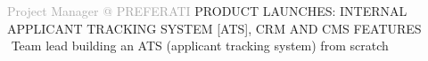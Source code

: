 \begin{cvtable}
%
% 
{\textcolor{darkgray}{%
Project Manager
\newline
@
{P\scriptsize REFERATI}
}}%
{
}%
{%
    {\scriptsize PRODUCT LAUNCHES:
    INTERNAL APPLICANT TRACKING SYSTEM [ATS], %
    CRM AND CMS FEATURES
    } \\
     \textperiodcentered $ $ Team lead building an ATS (applicant tracking system) from scratch \\
}
\end{cvtable}

